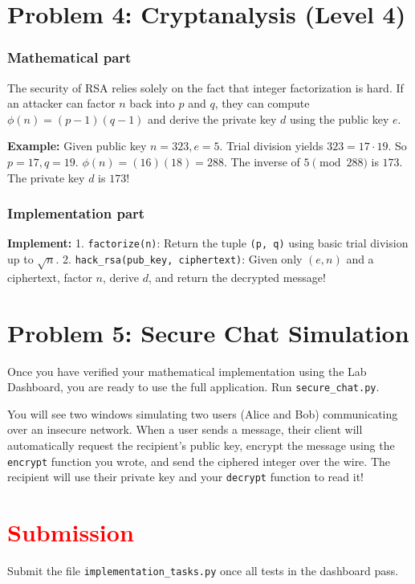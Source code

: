\documentclass[11pt]{article}
\begin{document}
\section*{Problem 4: Cryptanalysis (Level 4)}

\subsubsection*{Mathematical part}
The security of RSA relies solely on the fact that integer factorization is hard. If an attacker can factor $n$ back into $p$ and $q$, they can compute $\phi(n) = (p-1)(q-1)$ and derive the private key $d$ using the public key $e$.

\textbf{Example:} Given public key $n=323, e=5$.
Trial division yields $323 = 17 \cdot 19$. So $p=17, q=19$.
$\phi(n) = (16)(18) = 288$.
The inverse of $5 \pmod{288}$ is $173$. The private key $d$ is $173$!

\subsubsection*{Implementation part}
\textbf{Implement:}
1. \lstinline|factorize(n)|: Return the tuple \lstinline|(p, q)| using basic trial division up to $\sqrt{n}$.
2. \lstinline|hack_rsa(pub_key, ciphertext)|: Given only $(e, n)$ and a ciphertext, factor $n$, derive $d$, and return the decrypted message!


\section*{Problem 5: Secure Chat Simulation}

Once you have verified your mathematical implementation using the Lab Dashboard, you are ready to use the full application. Run \lstinline|secure_chat.py|. 

You will see two windows simulating two users (Alice and Bob) communicating over an insecure network. 
When a user sends a message, their client will automatically request the recipient's public key, encrypt the message using the \lstinline|encrypt| function you wrote, and send the ciphered integer over the wire. The recipient will use their private key and your \lstinline|decrypt| function to read it!


\section*{\textcolor{red}{Submission}}

Submit the file \texttt{implementation\_tasks.py} once all tests in the dashboard pass.
\end{document}
